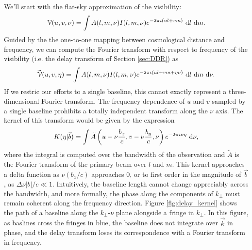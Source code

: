 We'll start with the flat-sky approximation of the visibility:
\begin{equation}
  \mathcal{V}(u,v,\nu) = \int A(l,m,\nu)I(l,m,\nu)e^{-2\pi i (ul+vm)}\ \mathrm{d}l\ \mathrm{d}m.
\end{equation}
Guided by the the one-to-one mapping between cosmological distance and frequency, we 
can compute the Fourier transform with respect to frequency of the visibility (i.e. the delay
transform of Section \ref{sec:DDR}) as 
\begin{equation}
  \widetilde{\mathcal{V}}(u,v,\eta) = \int A(l,m,\nu)I(l,m,\nu)
    e^{-2\pi i(ul+vm+\eta\nu)}\ \mathrm{d}l\ \mathrm{d}m\ \mathrm{d}\nu.
  \label{eq:def_delaytransform}
\end{equation}
If we restric our efforts to a single baseline, this cannot exactly represent a three-dimensional
Fourier transform. The frequency-dependence of $u$ and $v$ sampled by a single baseline prohibits a
totally independent transform along the $\nu$ axis. The kernel of this transform would be given by
the expression
\begin{equation}
  K(\eta|\vec{b}) = \int \tilde{A}\left(
    u-\nu\frac{b_x}{c},
    v-\nu\frac{b_y}{c},\nu\right)
    e^{-2\pi i\nu\eta}
    \ \mathrm{d}\nu,
\end{equation}
where the integral is computed over the bandwidth of the observation and $\tilde{A}$ is the
Fourier transform of the primary beam over $l$ and $m$. This kernel approaches a delta function as
$\nu(b_x/c)$ approaches $0$, or to first order in the magnitude of $\vec{b}$, as 
$\Delta\nu|b|/c \ll 1$. Intuitively, the baseline length cannot change appreciably across the
bandwidth, and more formally, the phase along the components of $k_\perp$ must remain coherent along
the frequency direction. Figure \ref{fig:delay_kernel} shows the path of a baseline along the
$k_\perp$-$\nu$ plane alongside a fringe in $k_\perp$. In this figure, as baslines cross the fringes
in blue, the baseline does not integrate over $\vec{k}$ in phase, and the delay transform loses its
correspondence with a Fourier transform in frequency.

